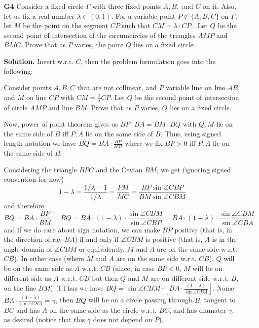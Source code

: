 \documentclass[11pt,a4paper]{article}
\begin{document}
\begin{enumerate}
	\item [\textbf{G4}] Consider a fixed circle $\Gamma$ with three fixed points $A, B,$ and $C$ on it. Also, let us fix a real number $\lambda \in(0,1)$. For a variable point $P \not\in\{A, B, C\}$ on $\Gamma$, let $M$ be the point on the segment $CP$ such that $CM =\lambda\cdot  CP$ . Let $Q$ be the second point of intersection of the circumcircles of the triangles $AMP$ and $BMC$. Prove that as $P$ varies, the point $Q$ lies on a fixed circle.
	
	\textbf{Solution.} Invert w.r.t. $C$, then the problem formulation goes into the following: 
	
	Consider points $A, B, C$ that are not collinear, and $P$ variable line on line $AB$, and $M$ on line $CP$ with $CM=\frac{1}{\lambda}CP$. Let $Q$ be the second point of intersection of circle $AMP$ and line $BM$. Prove that as $P$ varies, $Q$ lies on a fixed circle. 
	
	Now, power of point theorem gives us $BP\cdot BA=BM\cdot BQ$ with $Q, M$ lie on the same side of $B$ iff $P, A$ lie on the same side of $B$. Thus, using signed length notation we have $BQ = BA\cdot \frac{BP}{BM}$ where we fix $BP>0$ iff $P, A$ lie on the same side of $B$. 
	
	Considering the triangle $BPC$ and the Cevian $BM$, we get (ignoring signed convention for now)
	\[
	1 - \lambda = \frac{1/\lambda - 1}{1/\lambda} = \frac{PM}{MC} = \frac{BP\sin\angle CBP}{BM\sin\angle CBM}
	\]
	and therefore 
	\[
	BQ = BA\cdot \frac{BP}{BM} = BQ = BA\cdot (1-\lambda) \cdot \frac{\sin\angle CBM}{\sin\angle CBP}
	= BA\cdot (1-\lambda) \cdot \frac{\sin\angle CBM}{\sin\angle CBA}
	\]
	and if we do care about sign notation, we can make $BP$ positive (that is, in the direction of ray $BA$) if and only if $\angle CBM$ is positive (that is, $A$ is in the angle domain of $\angle CBM$ or equivalently, $M$ and $A$ are on the same side w.r.t. $CB$). In either case (where $M$ and $A$ are on the same side w.r.t. $CB$), $Q$ will be on the same side as $A$ w.r.t. $CB$ (since, in case $BP<0$, $M$ will be on different side as $A$ w.r.t. $CB$ but then $Q$ and $M$ are on different side w.r.t. $B$, on the line $BM$). TThus we have $BQ=\sin\angle CBM\cdot [BA\cdot \frac{(1-\lambda)}{\sin\angle CBA}]$. Name $BA\cdot \frac{(1-\lambda)}{\sin\angle CBA}=\gamma$, then $BQ$ will be on a circle passing through $B$, tangent to $BC$ and has $A$ on the same side as the circle w.r.t. $BC$, and has diamater $\gamma$, as desired (notice that this $\gamma$ does not depend on $P$). 
	

\end{enumerate}
\end{document}
